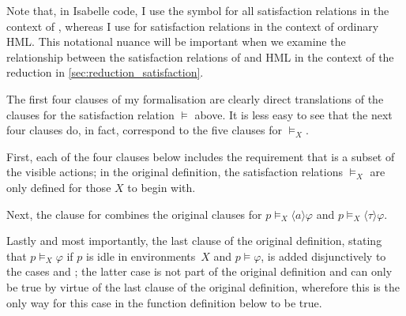 \begin{isabellebody}
\begin{isamarkuptext}
Note that, in Isabelle code, I use the symbol \isa{{\isasymTTurnstile}} for all satisfaction relations in the context of \HMLt{}, whereas I use \isa{{\isasymTurnstile}} for satisfaction relations in the context of ordinary HML. 
This notational nuance will be important when we examine the relationship between the satisfaction relations of \HMLt{} and HML in the context of the reduction in \cref{sec:reduction_satisfaction}.

The first four clauses of my formalisation are clearly direct translations of the clauses for the satisfaction relation $\vDash$ above. It is less easy to see that the next four clauses do, in fact, correspond to the five clauses for $\vDash_X$. 

First, each of the four clauses below includes the requirement that  is a subset of the visible actions; in the original definition, the satisfaction relations $\vDash_X$ are only defined for those $X$ to begin with.

Next, the clause for  combines the original clauses for $p \vDash_X \langle a \rangle \varphi$ and $p \vDash_X \langle \tau \rangle \varphi$. 

Lastly and most importantly, the last clause of the original definition, stating that $p \vDash_X \varphi$ if $p$ is idle in environments~$X$ and $p \vDash \varphi$, is added disjunctively to the cases  and ; the latter case is not part of the original definition and can only be true by virtue of the last clause of the original definition, wherefore this is the only way for this case in the function definition below to be true. 


\end{isamarkuptext}
\end{isabellebody}
